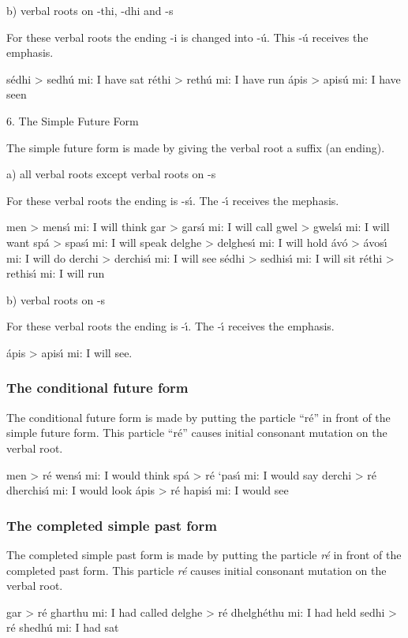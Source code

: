 b) verbal roots on -thi, -dhi and -s

For these verbal roots the ending -i is changed into -\'{u}. This -\'{u} receives the emphasis.

s\'{e}dhi > sedh\'{u} mi: I have sat
r\'{e}thi > reth\'{u} mi: I have run
\'{a}pis > apis\'{u} mi: I have seen

6. The Simple Future Form

The simple future form is made by giving the verbal root a suffix (an ending).

a) all verbal roots except verbal roots on -s

For these verbal roots the ending is -s\'{\i}. The -\'{\i} receives the mephasis.

men > mens\'{\i} mi: I will think
gar > gars\'{\i} mi: I will call
gwel > gwels\'{\i} mi: I will want
sp\'{a} > spas\'{\i} mi: I will speak
delghe > delghes\'{\i} mi: I will hold
\'{a}v\'{o} > \'{a}vos\'{\i} mi: I will do
derchi > derchis\'{\i} mi: I will see
s\'{e}dhi > sedhis\'{\i} mi: I will sit
r\'{e}thi > rethis\'{\i} mi: I will run

b) verbal roots on -s

For these verbal roots the ending is -\'{\i}. The -\'{\i} receives the emphasis.

\'{a}pis > apis\'{\i} mi: I will see.

\subsubsection{The conditional future form}

The conditional future form is made by putting the particle “r\'{e}” in front of the simple future form. This particle “r\'{e}” causes initial consonant mutation on the verbal root.

men > r\'{e} wens\'{\i} mi: I would think
sp\'{a} > r\'{e} ‘pas\'{\i} mi: I would say
derchi > r\'{e} dherchis\'{\i} mi: I would look
\'{a}pis > r\'{e} hapis\'{\i} mi: I would see

\subsubsection{The completed simple past form}

The completed simple past form is made by putting the particle \textit{r\'{e}} in front of the completed past form. This particle \textit{r\'{e}} causes initial consonant mutation on the verbal root.

gar > r\'{e} gharthu mi: I had called
delghe > r\'{e} dhelgh\'{e}thu mi: I had held
sedhi > r\'{e} shedh\'{u} mi: I had sat

